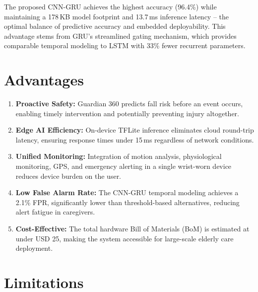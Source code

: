 \documentclass[conference]{IEEEtran}
\begin{document}
The proposed CNN-GRU achieves the highest accuracy (96.4\%) while maintaining a 178\,KB model footprint and 13.7\,ms inference latency -- the optimal balance of predictive accuracy and embedded deployability. This advantage stems from GRU's streamlined gating mechanism, which provides comparable temporal modeling to LSTM with 33\% fewer recurrent parameters.

\section{Advantages}

\begin{enumerate}
  \item \textbf{Proactive Safety:} Guardian 360 predicts fall risk before an event occurs, enabling timely intervention and potentially preventing injury altogether.
  \item \textbf{Edge AI Efficiency:} On-device TFLite inference eliminates cloud round-trip latency, ensuring response times under 15\,ms regardless of network conditions.
  \item \textbf{Unified Monitoring:} Integration of motion analysis, physiological monitoring, GPS, and emergency alerting in a single wrist-worn device reduces device burden on the user.
  \item \textbf{Low False Alarm Rate:} The CNN-GRU temporal modeling achieves a 2.1\% FPR, significantly lower than threshold-based alternatives, reducing alert fatigue in caregivers.
  \item \textbf{Cost-Effective:} The total hardware Bill of Materials (BoM) is estimated at under USD 25, making the system accessible for large-scale elderly care deployment.
\end{enumerate}

\section{Limitations}
\end{document}
